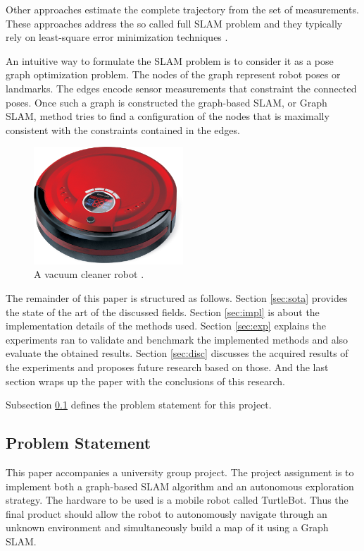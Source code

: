 \documentclass{ba-kecs}
\begin{document}
Other approaches estimate the complete trajectory from the set of measurements. These approaches address the so called full SLAM problem and they typically rely on least-square error minimization techniques \cite{Leastsquares}.

An intuitive way to formulate the SLAM problem is to consider it as a pose graph optimization problem. The nodes of the graph represent robot poses or landmarks. The edges encode sensor measurements that constraint the connected poses. Once such a graph is constructed the graph-based SLAM, or Graph SLAM, method tries to find a configuration of the nodes that is maximally consistent with the constraints contained in the edges.\\


\begin{figure}[h]
	\centering
		\includegraphics[width=0.50\textwidth]{figures/vacuum_cleaner.jpg}
	\caption{A vacuum cleaner robot \citep{VacuumRobot}.}
	\label{fig:vacuum_cleaner}
\end{figure}

The remainder of this paper is structured as follows. Section \ref{sec:sota} provides the state of the art of the discussed fields. Section \ref{sec:impl} is about the implementation details of the methods used. Section \ref{sec:exp} explains the experiments ran to validate and benchmark the implemented methods and also evaluate the obtained results. Section \ref{sec:disc} discusses the acquired results of the experiments and proposes future research based on those. And the last section wraps up the paper with the conclusions of this research.

Subsection \ref{sec:problem} defines the problem statement for this project.
\subsection{Problem Statement}
\label{sec:problem}
This paper accompanies a university group project. The project assignment is to implement both a graph-based SLAM algorithm and an autonomous exploration strategy. The hardware to be used is a mobile robot called TurtleBot. Thus the final product should allow the robot to autonomously navigate through an unknown environment and simultaneously build a map of it using a Graph SLAM.
\end{document}
